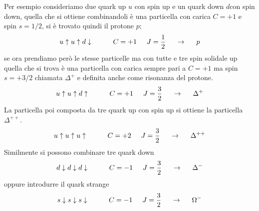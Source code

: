 Per esempio consideriamo due quark up $u$ con spin up e un quark down $d$con spin down, quella che si ottiene combinandoli è una particella con carica $C=+1$ e spin $s=1/2$, si è trovato quindi il protone $p$;
\begin{equation}
u\uparrow u\uparrow d\downarrow\hspace{1cm}C=+1\hspace{0.5cm}J=\frac{1}{2}\hspace{0.5cm}\to \hspace{0.5cm}p
\end{equation}
se ora prendiamo però le stesse particelle ma con tutte e tre spin solidale up quella che si trova è una particella con carica sempre pari a $C=+1$ ma spin $s=+3/2$ chiamata $\Delta^+$ e definita anche come risonanza del protone.
\begin{equation}
u\uparrow u\uparrow d\uparrow\hspace{1cm}C=+1\hspace{0.5cm}J=\frac{3}{2}\hspace{0.5cm}\to \hspace{0.5cm}\Delta^{+}
\end{equation}
La particella poi composta da tre quark up con spin up si ottiene la particella $\Delta^{++}$.
\begin{equation}
u\uparrow u\uparrow u\uparrow\hspace{1cm}C=+2\hspace{0.5cm}J=\frac{3}{2}\hspace{0.5cm}\to \hspace{0.5cm}\Delta^{++}
\end{equation}
Similmente si possono combinare tre quark down
\begin{equation}
d\downarrow d\downarrow d\downarrow\hspace{1cm}C=-1\hspace{0.5cm}J=\frac{3}{2}\hspace{0.5cm}\to \hspace{0.5cm}\Delta^{-}
\end{equation}
oppure introdurre il quark strange
\begin{equation}
s\downarrow s\downarrow s\downarrow\hspace{1cm}C=-1\hspace{0.5cm}J=\frac{3}{2}\hspace{0.5cm}\to \hspace{0.5cm}\Omega^{-}
\end{equation}


